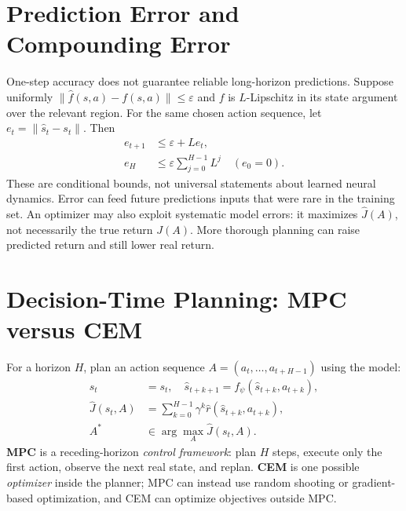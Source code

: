 \section{Prediction Error and Compounding Error}
One-step accuracy does not guarantee reliable long-horizon predictions. Suppose uniformly
$\|\hat f(s,a)-f(s,a)\|\le\varepsilon$ and $f$ is $L$-Lipschitz in its state argument over the relevant region. For the same chosen action sequence, let $e_t=\|\hat s_t-s_t\|$. Then
\begin{align}
e_{t+1}&\le\varepsilon+Le_t,\\
e_H&\le\varepsilon\sum_{j=0}^{H-1}L^j\quad(e_0=0).
\end{align}
These are conditional bounds, not universal statements about learned neural dynamics. Error can feed future predictions inputs that were rare in the training set. An optimizer may also exploit systematic model errors: it maximizes $\hat J(A)$, not necessarily the true return $J(A)$. More thorough planning can raise predicted return and still lower real return.

\section{Decision-Time Planning: MPC versus CEM}
For a horizon $H$, plan an action sequence $A=(a_t,\ldots,a_{t+H-1})$ using the model:
\begin{align}
\hat s_t&=s_t,\quad
\hat s_{t+k+1}=f_\psi(\hat s_{t+k},a_{t+k}),\\
\hat J(s_t,A)&=\sum_{k=0}^{H-1}\gamma^k
\hat r(\hat s_{t+k},a_{t+k}),\\
A^*&\in\arg\max_A\hat J(s_t,A).
\end{align}
\textbf{MPC} is a receding-horizon \emph{control framework}: plan $H$ steps, execute only the first action, observe the next real state, and replan. \textbf{CEM} is one possible \emph{optimizer} inside the planner; MPC can instead use random shooting or gradient-based optimization, and CEM can optimize objectives outside MPC.

